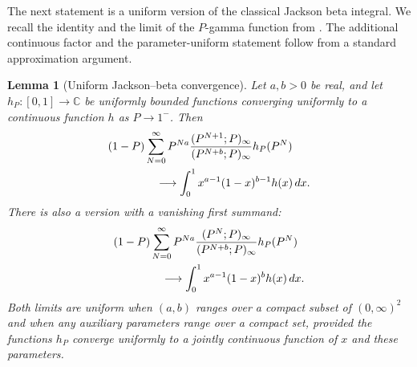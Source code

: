 \documentclass[12pt]{amsart}
\newtheorem{lem}[thm]{Lemma}
\theoremstyle{definition}
\numberwithin{equation}{section}
\theoremstyle{definition}
\def\C{{\mathbb C}}
\def\beq{\begin{equation}}
\def\eeq{\end{equation}}
\begin{document}
The next statement is a uniform version of the classical
Jackson beta integral.  We recall the identity and the
limit of the $P$-gamma function from
\cite[(5.18.10)--(5.18.12)]{DLMF}.  The
additional continuous factor and the parameter-uniform
statement follow from a standard approximation argument.

\begin{lem}[Uniform Jackson--beta convergence]
\label{lem:hyp-Jackson-beta}
Let $a,b>0$ be real, and let $h_P:[0,1]\to\C$ be uniformly
bounded functions converging uniformly to a continuous
function $h$ as $P\to1^-$.  Then
\beq\label{eq:hyp-beta-lemma}
 \begin{aligned}
 &(1-P)\sum_{N=0}^\infty P^{Na}
 \frac{(P^{N+1};P)_\infty}{(P^{N+b};P)_\infty}
 h_P(P^N)\\
 &\hspace{15mm}\longrightarrow
 \int_0^1x^{a-1}(1-x)^{b-1}h(x)\,dx.
 \end{aligned}
\eeq
There is also a version with a vanishing first summand:
\beq\label{eq:hyp-beta-shifted}
 \begin{aligned}
 &(1-P)\sum_{N=0}^\infty P^{Na}
 \frac{(P^N;P)_\infty}{(P^{N+b};P)_\infty}
 h_P(P^N)\\
 &\hspace{15mm}\longrightarrow
 \int_0^1x^{a-1}(1-x)^b h(x)\,dx.
 \end{aligned}
\eeq
Both limits are uniform when $(a,b)$ ranges over a compact
subset of $(0,\infty)^2$ and when any auxiliary parameters
range over a compact set, provided the functions $h_P$
converge uniformly to a jointly continuous function of
$x$ and these parameters.
\end{lem}
\end{document}
